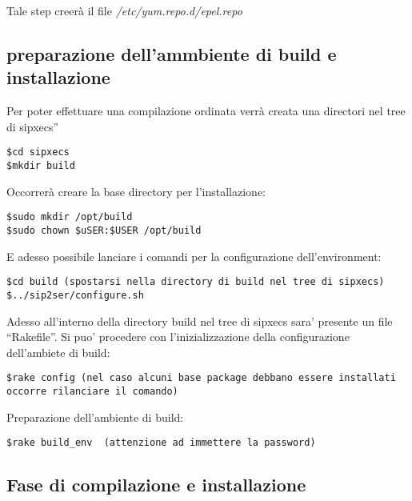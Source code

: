 Tale step creer\`a il file \emph{/etc/yum.repo.d/epel.repo}

\subsection{preparazione dell'ammbiente di build e installazione}

Per poter effettuare una compilazione ordinata verr\`a creata una directori nel tree di sipxecs''

\begin{verbatim}
$cd sipxecs
$mkdir build
\end{verbatim}

Occorrer\`a creare la base directory per l'installazione:

\begin{verbatim}
$sudo mkdir /opt/build
$sudo chown $uSER:$USER /opt/build
\end{verbatim}

E adesso possibile lanciare i comandi per la configurazione dell'environment:

\begin{verbatim}
$cd build (spostarsi nella directory di build nel tree di sipxecs)
$../sip2ser/configure.sh 
\end{verbatim}

Adesso all'interno della directory build nel tree di sipxecs sara' presente un file ``Rakefile''. Si puo' procedere con l'inizializzazione della configurazione dell'ambiete di build:

\begin{verbatim}
$rake config (nel caso alcuni base package debbano essere installati occorre rilanciare il comando)
\end{verbatim}

Preparazione dell'ambiente di build:

\begin{verbatim}
$rake build_env  (attenzione ad immettere la password)
\end{verbatim}


\subsection{Fase di compilazione e installazione}


